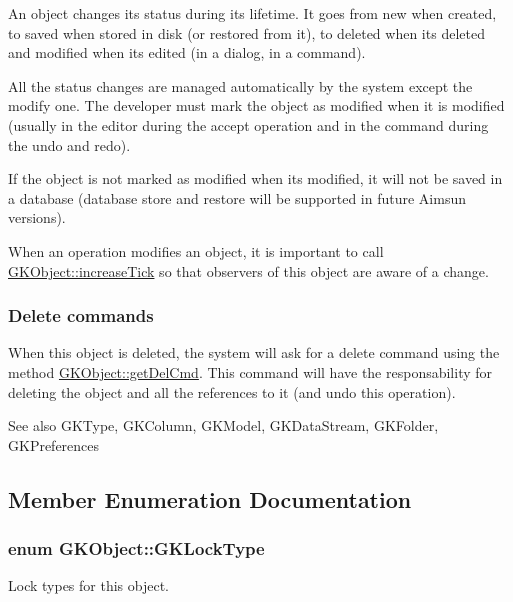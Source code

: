 An object changes its status during its lifetime. It goes from \textquotesingle{}new\textquotesingle{} when created, to \textquotesingle{}saved\textquotesingle{} when stored in disk (or restored from it), to \textquotesingle{}deleted\textquotesingle{} when it\textquotesingle{}s deleted and \textquotesingle{}modified\textquotesingle{} when it\textquotesingle{}s edited (in a dialog, in a command).

All the status changes are managed automatically by the system except the \textquotesingle{}modify\textquotesingle{} one. The developer must mark the object as modified when it is modified (usually in the editor during the accept operation and in the command during the undo and redo).

If the object is not marked as modified when it\textquotesingle{}s modified, it will not be saved in a database (database store and restore will be supported in future Aimsun versions).

When an operation modifies an object, it is important to call \hyperlink{classGKObject_aa021efb86f83770079d8f10f4cf67b99}{G\+K\+Object\+::increase\+Tick} so that observers of this object are aware of a change.

\subsubsection*{Delete commands}

When this object is deleted, the system will ask for a delete command using the method \hyperlink{classGKObject_ac4a47dac5d37a254e97bee6946c755b7}{G\+K\+Object\+::get\+Del\+Cmd}. This command will have the responsability for deleting the object and all the references to it (and undo this operation).

\begin{DoxySeeAlso}{See also}
G\+K\+Type, G\+K\+Column, G\+K\+Model, G\+K\+Data\+Stream, G\+K\+Folder, G\+K\+Preferences 
\end{DoxySeeAlso}


\subsection{Member Enumeration Documentation}
\subsubsection[{\texorpdfstring{G\+K\+Lock\+Type}{GKLockType}}]{\setlength{\rightskip}{0pt plus 5cm}enum {\bf G\+K\+Object\+::\+G\+K\+Lock\+Type}}\hypertarget{classGKObject_a097bd6e3a9c40a1b2d53cde7b171c851}{}\label{classGKObject_a097bd6e3a9c40a1b2d53cde7b171c851}
Lock types for this object. 
